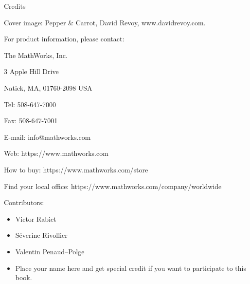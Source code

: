 \noindent 
\begin{note}
	Credits
	
	Cover image: Pepper \& Carrot, David Revoy, www.davidrevoy.com.
	
	\end{note}

\begin{mcomment}
\begin{mhelp}
For \matlabregistered{} product information, please contact:

The MathWorks, Inc.

3 Apple Hill Drive

Natick, MA, 01760-2098 USA

Tel: 508-647-7000

Fax: 508-647-7001

E-mail: info@mathworks.com

Web: https://www.mathworks.com

How to buy: https://www.mathworks.com/store

Find your local office: https://www.mathworks.com/company/worldwide
\end{mhelp}
\end{mcomment}

Contributors:

\begin{itemize}
 \item Victor Rabiet
 \item Séverine Rivollier
 \item Valentin Penaud--Polge
 \item Place your name here and get special credit if you want to participate to this book.
\end{itemize}

